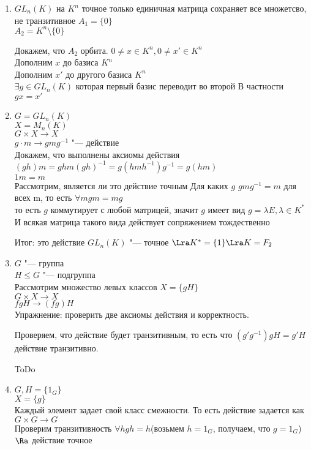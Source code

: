 \begin{exmp}
\begin{enumerate}
\item $GL_n(K)$ на $K^n$
точное только единичная матрица сохраняет все множетсво, не транзитивное
$A_1 = \{0\}$\\
$A_2 = K^n\setminus \{0\}$

Докажем, что $A_2$ орбита.
$0 \ne x \in K^{n}, 0 \ne x' \in K^n$\\
Дополним $x$ до базиса $K^n$\\
Дополним $x'$ до другого базиса $K^n$\\
$\exists g\in GL_n(K)$ которая первый базис переводит во второй
В частности $gx = x'$\\
\item 
$G = GL_n(K)$ \\
$X = M_n(K)$ \\
$G \times X \to X$ \\
$g \cdot m \to gmg^{-1}$ "--- действие\\
Докажем, что выполнены аксиомы действия\\
$(gh)m = ghm(gh)^{-1} = g(hmh^{-1})g^{-1} = g(hm)$\\
$1m = m$\\

Рассмотрим, является ли это действие точным 
Для каких $g$ $gmg^{-1} = m$ для всех m, то есть $\forall m gm = mg$\\
то есть $g$ коммутирует с любой матрицей, значит $g$ имеет вид 
$g = \lambda E, \lambda \in K^{*}$\\
И всякая матрица такого вида действует сопряжением тождественно

Итог: это действие $GL_n(K)$  "--- точное $\Lra K^* = \{1\} \Lra K = F_2$ \\
\item
$G$ "--- группа \\
$H \le G$ "--- подгруппа\\
Рассмотрим множество левых классов $X = \{gH\}$\\
$G \times X \to X$\\
$f gH \to (fg)H$\\
Упражнение: проверить две аксиомы действия и корректность. 

Проверяем, что действие будет транзитивным, то есть что 
$(g'g^{-1})gH = g'H$ действие транзитивно.

ToDo
\item
$G, H = \{1_G\}$\\
$X = \{g\}$\\
Каждый элемент задает свой класс смежности. 
То есть действие задается как 
$G \times G \to G$\\
Проверим транзитивность
$\forall h gh = h$(возьмем $h = 1_G$, получаем, что $g = 1_G$)\\
$\Ra$ действие точное


\end{enumerate}
\end{exmp}

